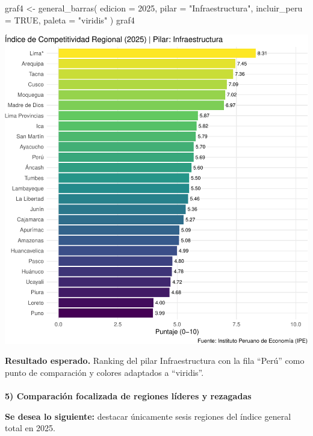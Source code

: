 \documentclass[
  11pt,
  letterpaper,
  DIV=11,
  numbers=noendperiod]{scrartcl}
\makeatletter
\let\oldparagraph\paragraph
\renewcommand{\paragraph}{
    \@ifstar
      \xxxParagraphStar
      \xxxParagraphNoStar
  }
\newcommand{\xxxParagraphStar}[1]{\oldparagraph*{#1}\mbox{}}
\newcommand{\xxxParagraphNoStar}[1]{\oldparagraph{#1}\mbox{}}
\newenvironment{Shaded}{\begin{snugshade}}{\end{snugshade}}
\newcommand{\AttributeTok}[1]{\textcolor[rgb]{0.40,0.45,0.13}{#1}}
\newcommand{\ConstantTok}[1]{\textcolor[rgb]{0.56,0.35,0.01}{#1}}
\newcommand{\DecValTok}[1]{\textcolor[rgb]{0.68,0.00,0.00}{#1}}
\newcommand{\FunctionTok}[1]{\textcolor[rgb]{0.28,0.35,0.67}{#1}}
\newcommand{\NormalTok}[1]{\textcolor[rgb]{0.00,0.23,0.31}{#1}}
\newcommand{\OtherTok}[1]{\textcolor[rgb]{0.00,0.23,0.31}{#1}}
\newcommand{\StringTok}[1]{\textcolor[rgb]{0.13,0.47,0.30}{#1}}
\makeatother
\begin{document}
\begin{Shaded}
\begin{Highlighting}[]
\NormalTok{graf4 }\OtherTok{\textless{}{-}} \FunctionTok{general\_barras}\NormalTok{(}
  \AttributeTok{edicion =} \DecValTok{2025}\NormalTok{,}
  \AttributeTok{pilar =} \StringTok{"Infraestructura"}\NormalTok{,}
  \AttributeTok{incluir\_peru =} \ConstantTok{TRUE}\NormalTok{,}
  \AttributeTok{paleta =} \StringTok{"viridis"}
\NormalTok{)}
\NormalTok{graf4}
\end{Highlighting}
\end{Shaded}

\includegraphics{Manual_files/figure-pdf/unnamed-chunk-19-1.pdf}

\textbf{Resultado esperado.} Ranking del pilar Infraestructura con la
fila ``Perú'' como punto de comparación y colores adaptados a
``viridis''.

\paragraph{\texorpdfstring{\textbf{5) Comparación focalizada de regiones
líderes y
rezagadas}}{5) Comparación focalizada de regiones líderes y rezagadas}}\label{comparaciuxf3n-focalizada-de-regiones-luxedderes-y-rezagadas}

\textbf{Se desea lo siguiente:} destacar únicamente sesis regiones del
índice general total en 2025.
\end{document}
